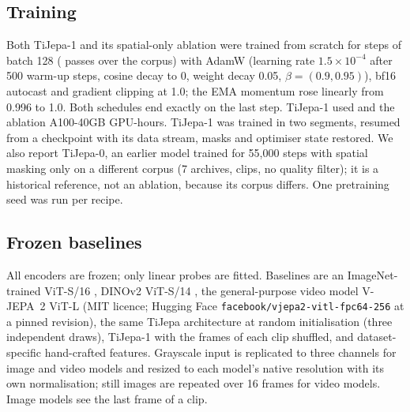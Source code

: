 \subsection{Training}
Both TiJepa-1 and its spatial-only ablation were trained from scratch for
 steps of batch 128 ( passes over the corpus) with
AdamW (learning rate $1.5\times10^{-4}$ after 500 warm-up steps, cosine decay to 0, weight
decay 0.05, $\beta=(0.9, 0.95)$), bf16 autocast and gradient clipping at 1.0; the EMA
momentum rose linearly from 0.996 to 1.0. Both schedules end exactly on the last step.
TiJepa-1 used  and the ablation  A100-40GB GPU-hours.
TiJepa-1 was trained in two segments, resumed from a checkpoint with its data stream,
masks and optimiser state restored. We also report TiJepa-0, an earlier model trained for
55{,}000 steps with spatial masking only on a different corpus (7 archives,
 clips, no quality filter); it is a historical reference, not an ablation, because its corpus differs.
One pretraining seed was run per recipe.

\subsection{Frozen baselines}
All encoders are frozen; only linear probes are fitted. Baselines are an ImageNet-trained
ViT-S/16 \citep{augreg}, DINOv2 ViT-S/14 \citep{dinov2}, the
general-purpose video model V-JEPA~2 ViT-L \citep{vjepa2} (MIT licence;
Hugging Face \texttt{facebook/vjepa2-vitl-fpc64-256} at a pinned revision), the same
TiJepa architecture at random initialisation (three independent draws), TiJepa-1 with the
frames of each clip shuffled, and dataset-specific hand-crafted features. Grayscale input
is replicated to three channels for image and video models and resized to each model's
native resolution with its own normalisation; still images are repeated over 16 frames for
video models. Image models see the last frame of a clip.

